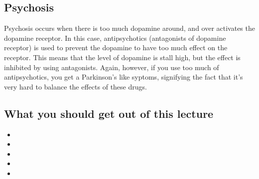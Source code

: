 \subsection{Psychosis}

Psychosis occurs when there is too much dopamine around, and over activates the dopamine receptor.
In this case, antipsychotics (antagonists of dopamine receptor) is used to prevent the dopamine to have too much effect on the receptor.
This means that the level of dopamine is stall high, but the effect is inhibited by using antagonists.
Again, however, if you use too much of antipsychotics, you get a Parkinson's like syptoms, signifying the fact that it's very hard to balance the effects of these drugs.

\subsection*{What you should get out of this lecture}

\begin{itemize}
	\item 
	\item 
	\item 
	\item 
	\item 
\end{itemize}
